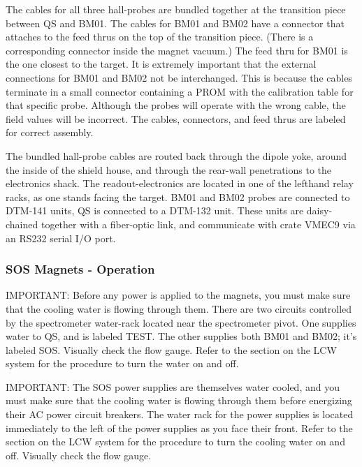 The cables for all three hall-probes are bundled together at the transition
piece between QS and BM01. The cables for BM01 and BM02 have a connector that
attaches to the feed thrus on the top of the transition piece. (There is a
corresponding connector inside the magnet vacuum.) The feed thru for BM01 is
the one closest to the target. It is extremely important that the external
connections for BM01 and BM02 not be interchanged. This is because the cables
terminate in a small connector containing a PROM with the calibration table for
that specific probe. Although the probes will operate with the wrong cable, the
field values will be incorrect. The cables, connectors, and feed thrus are
labeled for correct assembly.

The bundled hall-probe cables are routed back through the dipole yoke, around
the inside of the shield house, and through the rear-wall penetrations to the
electronics shack. The readout-electronics are located in one of the lefthand
relay racks, as one stands facing the target. BM01 and BM02 probes are connected
to DTM-141 units, QS is connected to a DTM-132 unit. These units are
daisy-chained together with a fiber-optic link, and communicate with crate
VMEC9 via an RS232 serial I/O port.

\subsubsection {SOS Magnets - Operation}

IMPORTANT: Before any power is applied to the magnets, you must make sure that
the cooling water is flowing through them. There are two circuits controlled by
the spectrometer water-rack located near the spectrometer pivot. One supplies
water to QS, and is labeled TEST. The other supplies both BM01 and BM02; it's
labeled SOS. Visually check the flow gauge.
Refer to the section on the LCW system for the procedure to turn the water on and off.

IMPORTANT: The SOS power supplies are themselves water cooled, and you must
make sure that the cooling water is flowing through them before energizing
their AC power circuit breakers. The water rack for the power supplies is
located immediately to the left of the power supplies as you face their front.
Refer to the section on the LCW system for the procedure to turn the cooling water on and off.
Visually check the flow gauge.

